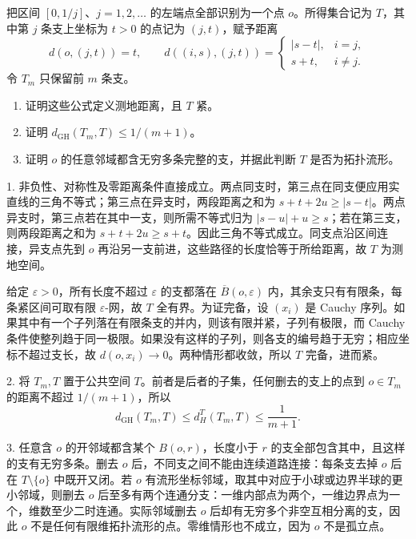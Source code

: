 \begin{exercise}\label{g3:ex:shrinking-star-gh-limit}
	把区间 \([0,1/j]\)、\(j=1,2,\ldots\) 的左端点全部识别为一个点 \(o\)。所得集合记为 \(T\)，其中第 \(j\) 条支上坐标为 \(t>0\) 的点记为 \((j,t)\)，赋予距离
	\[
		d(o,(j,t))=t,\qquad
		d((i,s),(j,t))=
		\begin{cases}|s-t|,&i=j,\\s+t,&i\ne j.\end{cases}
	\]
	令 \(T_m\) 只保留前 \(m\) 条支。
	\begin{enumerate}
		\item 证明这些公式定义测地距离，且 \(T\) 紧。
		\item 证明 \(d_{\mathrm{GH}}(T_m,T)\le1/(m+1)\)。
		\item 证明 \(o\) 的任意邻域都含无穷多条完整的支，并据此判断 \(T\) 是否为拓扑流形。
	\end{enumerate}
\end{exercise}
\begin{solution}
	1. 非负性、对称性及零距离条件直接成立。两点同支时，第三点在同支便应用实直线的三角不等式；第三点在异支时，两段距离之和为 \(s+t+2u\ge|s-t|\)。两点异支时，第三点若在其中一支，则所需不等式归为 \(|s-u|+u\ge s\)；若在第三支，则两段距离之和为 \(s+t+2u\ge s+t\)。因此三角不等式成立。同支点沿区间连接，异支点先到 \(o\) 再沿另一支前进，这些路径的长度恰等于所给距离，故 \(T\) 为测地空间。

	给定 \(\varepsilon>0\)，所有长度不超过 \(\varepsilon\) 的支都落在 \(\overline B(o,\varepsilon)\) 内，其余支只有有限条，每条紧区间可取有限 \(\varepsilon\)-网，故 \(T\) 全有界。为证完备，设 \((x_i)\) 是 Cauchy 序列。如果其中有一个子列落在有限条支的并内，则该有限并紧，子列有极限，而 Cauchy 条件使整列趋于同一极限。如果没有这样的子列，则各支的编号趋于无穷；相应坐标不超过支长，故 \(d(o,x_i)\to0\)。两种情形都收敛，所以 \(T\) 完备，进而紧。

	2. 将 \(T_m,T\) 置于公共空间 \(T\)。前者是后者的子集，任何删去的支上的点到 \(o\in T_m\) 的距离不超过 \(1/(m+1)\)，所以
	\[
		d_{\mathrm{GH}}(T_m,T)\le d_H^T(T_m,T)\le\frac1{m+1}.
	\]

	3. 任意含 \(o\) 的开邻域都含某个 \(B(o,r)\)，长度小于 \(r\) 的支全部包含其中，且这样的支有无穷多条。删去 \(o\) 后，不同支之间不能由连续道路连接：每条支去掉 \(o\) 后在 \(T\setminus\{o\}\) 中既开又闭。若 \(o\) 有流形坐标邻域，取其中对应于小球或边界半球的更小邻域，则删去 \(o\) 后至多有两个连通分支：一维内部点为两个，一维边界点为一个，维数至少二时连通。实际邻域删去 \(o\) 后却有无穷多个非空互相分离的支，因此 \(o\) 不是任何有限维拓扑流形的点。零维情形也不成立，因为 \(o\) 不是孤立点。
\end{solution}

